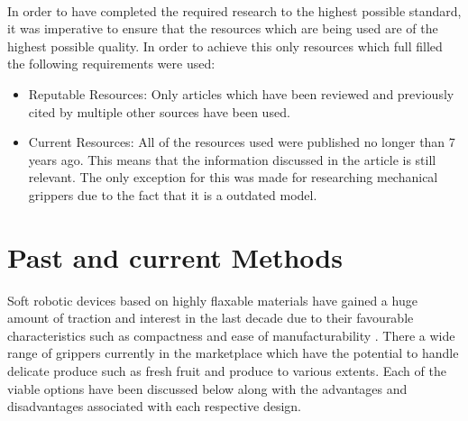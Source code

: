 \documentclass[11pt,twocolumn]{article}
\begin{document}
\\
\newline
In order to have completed the required research to the highest possible standard, it was imperative to ensure that the resources which are being used are of the highest possible quality. In order to achieve this only resources which full filled the following requirements were used:
\begin{itemize}
\item Reputable Resources: Only articles which have been reviewed and previously cited by multiple other sources have been used.
\item Current Resources: All of the resources used were published no longer than 7 years ago. This means that the information discussed in the article is still relevant. The only exception for this was made for researching mechanical grippers due to the fact that it is a outdated model.
\end{itemize}
\section{Past and current Methods}
Soft robotic devices based on highly flaxable materials have gained a huge amount of traction and interest in the last decade due to their favourable characteristics such as compactness and ease of manufacturability \cite{mutlu2013electroactive}. There a wide range of grippers currently in the marketplace which have the potential to handle delicate produce such as fresh fruit and produce to various extents. Each of the viable options have been discussed below along with the advantages and disadvantages associated with each respective design.
\end{document}
